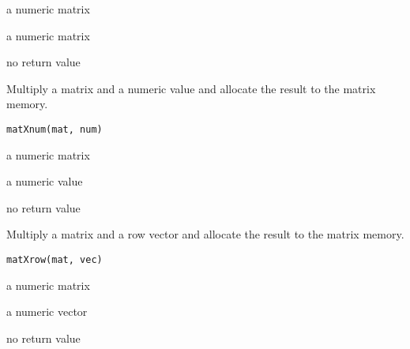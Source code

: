 \documentclass[letterpaper]{book}
\begin{document}
%
\begin{Arguments}
\begin{ldescription}
\item[\code{x}] a numeric matrix

\item[\code{y}] a numeric matrix
\end{ldescription}
\end{Arguments}
%
\begin{Value}
no return value
\end{Value}
%
\begin{Description}
Multiply a matrix and a numeric value and allocate the result to the matrix memory.
\end{Description}
%
\begin{Usage}
\begin{verbatim}
matXnum(mat, num)
\end{verbatim}
\end{Usage}
%
\begin{Arguments}
\begin{ldescription}
\item[\code{mat}] a numeric matrix

\item[\code{num}] a numeric value
\end{ldescription}
\end{Arguments}
%
\begin{Value}
no return value
\end{Value}
%
\begin{Description}
Multiply a matrix and a row vector and allocate the result to the matrix memory.
\end{Description}
%
\begin{Usage}
\begin{verbatim}
matXrow(mat, vec)
\end{verbatim}
\end{Usage}
%
\begin{Arguments}
\begin{ldescription}
\item[\code{mat}] a numeric matrix

\item[\code{vec}] a numeric vector
\end{ldescription}
\end{Arguments}
%
\begin{Value}
no return value
\end{Value}
\end{document}
